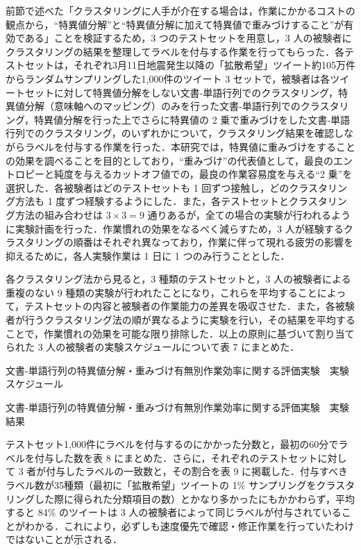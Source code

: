 \documentclass[japanese]{jnlp_1.4}
\begin{document}
前節で述べた「クラスタリングに人手が介在する場合は，作業にかかるコストの観点から，“特異値分解”と“特異値分解に加えて特異値で重みづけすること”が有効である」ことを検証するため，3 つのテストセットを用意し，3 人の被験者にクラスタリングの結果を整理してラベルを付与する作業を行ってもらった．各テストセットは，それぞれ3月11日地震発生以降の「拡散希望」ツイート約105万件からランダムサンプリングした1,000件のツイート 3 セットで，被験者は各ツイートセットに対して特異値分解をしない文書‐単語行列でのクラスタリング，特異値分解（意味軸へのマッピング）のみを行った文書‐単語行列でのクラスタリング，特異値分解を行った上でさらに特異値の 2 乗で重みづけをした文書‐単語行列でのクラスタリング，のいずれかについて，クラスタリング結果を確認しながらラベルを付与する作業を行った．本研究では，特異値に重みづけをすることの効果を調べることを目的としており，``重みづけ''の代表値として，最良のエントロピーと純度を与えるカットオフ値での，最良の作業容易度を与える``2 乗''を選択した．各被験者はどのテストセットも 1 回ずつ接触し，どのクラスタリング方法も 1 度ずつ経験するようにした．また，各テストセットとクラスタリング方法の組み合わせは $3 \times 3 = 9$ 通りあるが，全ての場合の実験が行われるように実験計画を行った．作業慣れの効果をなるべく減らすため，3 人が経験するクラスタリングの順番はそれぞれ異なっており，作業に伴って現れる疲労の影響を抑えるために，各人実験作業は 1 日に 1 つのみ行うこととした．

各クラスタリング法から見ると，3 種類のテストセットと，3 人の被験者による重複のない 9 種類の実験が行われたことになり，これらを平均することによって，テストセットの内容と被験者の作業能力の差異を吸収させた．また，各被験者が行うクラスタリング法の順が異なるように実験を行い，その結果を平均することで，作業慣れの効果を可能な限り排除した．以上の原則に基づいて割り当てられた 3 人の被験者の実験スケジュールについて表 7 にまとめた．

\begin{table}[b]
\caption{文書‐単語行列の特異値分解・重みづけ有無別作業効率に関する評価実験　実験スケジュール}

\end{table}
\begin{table}[b]
\caption{文書‐単語行列の特異値分解・重みづけ有無別作業効率に関する評価実験　実験結果}

\end{table}

テストセット1,000件にラベルを付与するのにかかった分数と，最初の60分でラベルを付与した数を表 8 にまとめた．さらに，それぞれのテストセットに対して 3 者が付与したラベルの一致数と，その割合を表 9 に掲載した．付与すべきラベル数が35種類（最初に「拡散希望」ツイートの 1\% サンプリングをクラスタリングした際に得られた分類項目の数）とかなり多かったにもかかわらず，平均すると 84\% のツイートは 3 人の被験者によって同じラベルが付与されていることがわかる．これにより，必ずしも速度優先で確認・修正作業を行っていたわけではないことが示される．
\end{document}
